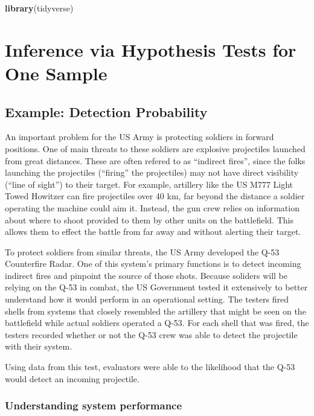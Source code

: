 \documentclass[
]{book}
\newenvironment{Shaded}{\begin{snugshade}}{\end{snugshade}}
\newcommand{\KeywordTok}[1]{\textcolor[rgb]{0.13,0.29,0.53}{\textbf{#1}}}
\newcommand{\NormalTok}[1]{#1}
\theoremstyle{definition}
\theoremstyle{definition}
\theoremstyle{definition}
\theoremstyle{remark}
\begin{document}
\begin{Shaded}
\begin{Highlighting}[]
\KeywordTok{library}\NormalTok{(tidyverse)}
\end{Highlighting}
\end{Shaded}

\hypertarget{HT}{%
\chapter{Inference via Hypothesis Tests for One Sample}\label{HT}}

\hypertarget{example-detection-probability}{%
\section{Example: Detection Probability}\label{example-detection-probability}}

An important problem for the US Army is protecting soldiers in forward positions. One of main threats to these soldiers are explosive projectiles launched from great distances. These are often refered to as ``indirect fires'', since the folks launching the projectiles (``firing'' the projectiles) may not have direct visibility (``line of sight'') to their target. For example, artillery like the US M777 Light Towed Howitzer can fire projectiles over 40 km, far beyond the distance a soldier operating the machine could aim it. Instead, the gun crew relies on information about where to shoot provided to them by other units on the battlefield. This allows them to effect the battle from far away and without alerting their target.

To protect soldiers from similar threats, the US Army developed the Q-53 Counterfire Radar. One of this system's primary functions is to detect incoming indirect fires and pinpoint the source of those shots. Because soliders will be relying on the Q-53 in combat, the US Government tested it extensively to better understand how it would perform in an operational setting. The testers fired shells from systems that closely resembled the artillery that might be seen on the battlefield while actual soldiers operated a Q-53. For each shell that was fired, the testers recorded whether or not the Q-53 crew was able to detect the projectile with their system.

Using data from this test, evaluators were able to the likelihood that the Q-53 would detect an incoming projectile.

\hypertarget{understanding-system-performance}{%
\subsection{Understanding system performance}\label{understanding-system-performance}}
\end{document}
